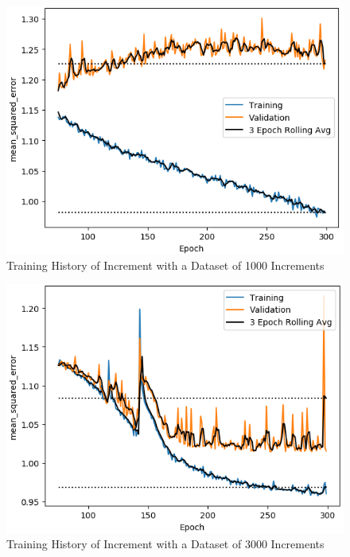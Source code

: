 \begin{figure}[b]
	\centering
	\includegraphics[scale=0.75]{Figures/TrainHistory_dataset_cases1000_C0_321_L0_13_0_321_0_13_48_1_allI0.png}
	\caption{Training History of Increment with a Dataset of 1000 Increments}
	\label{fig:history_1000}
\end{figure}

\begin{figure}[b]
	\centering
	\includegraphics[scale=0.75]{Figures/TrainHistory_dataset_cases3000_C0_321_L0_13_0_321_0_13_48_1_allI0.png}
	\caption{Training History of Increment with a Dataset of 3000 Increments}
	\label{fig:history_3000}
\end{figure}

